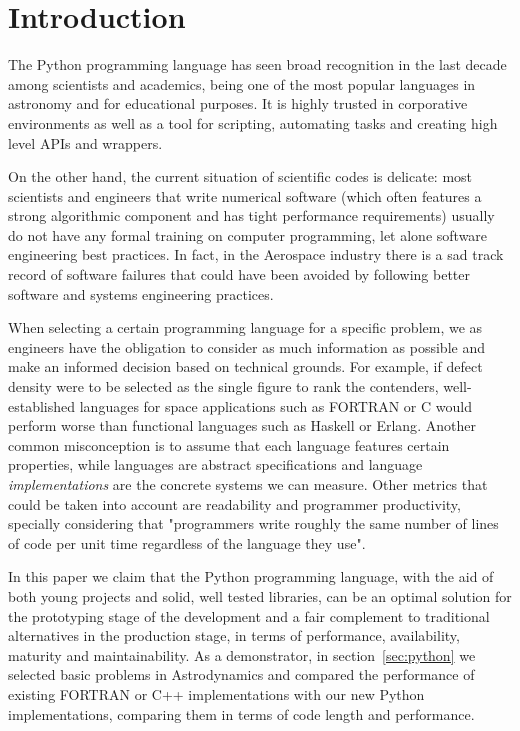 \section{Introduction}
\label{sec:intro}

The Python programming language has seen broad recognition in the last decade among scientists and academics, being one of the most popular languages in astronomy\citep{Robitaille2013} and for educational purposes\citep{guo2014python}. It is highly trusted in corporative environments as well as a tool for scripting, automating tasks and creating high level APIs and wrappers.

On the other hand, the current situation of scientific codes is delicate: most scientists and engineers that write numerical software (which often features a strong algorithmic component and has tight performance requirements) usually do not have any formal training on computer programming, let alone software engineering best practices\citep{Wilson2014}. In fact, in the Aerospace industry there is a sad track record of software failures\citep{albee2000report,lions1996report} that could have been avoided by following better software and systems engineering practices.

When selecting a certain programming language for a specific problem, we as engineers have the obligation to consider as much information as possible and make an informed decision based on technical grounds. For example, if defect density were to be selected as the single figure to rank the contenders, well-established languages for space applications such as FORTRAN or C would perform worse than functional languages such as Haskell or Erlang\citep{Ray2014}. Another common misconception is to assume that each language features certain properties, while languages are abstract specifications and language \textit{implementations} are the concrete systems we can measure. Other metrics that could be taken into account are readability and programmer productivity, specially considering that "programmers write roughly the same number of lines of code per unit time regardless of the language they use"\citep{Wilson2014}.

In this paper we claim that the Python programming language, with the aid of both young projects and solid, well tested libraries, can be an optimal solution for the prototyping stage of the development and a fair complement to traditional alternatives in the production stage, in terms of performance, availability, maturity and maintainability. As a demonstrator, in section~\ref{sec:python} we selected basic problems in Astrodynamics and compared the performance of existing FORTRAN or C++ implementations with our new Python implementations, comparing them in terms of code length and performance.

